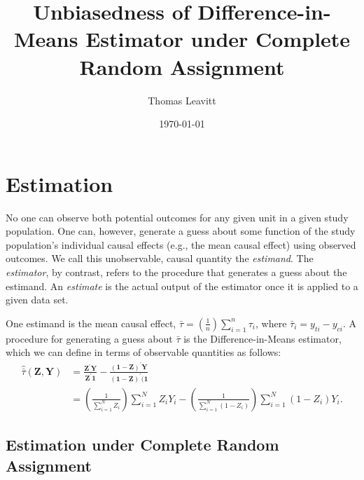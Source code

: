 \documentclass[12pt,leqno]{article}
\theoremstyle{newstyle}
\begin{document}
\begin{titlepage}
\title{Unbiasedness of Difference-in-Means Estimator under Complete Random Assignment}
\author{Thomas Leavitt}
\date{\today}
\maketitle
\end{titlepage}

\section{Estimation}

No one can observe both potential outcomes for any given unit in a given study population. One can, however, generate a guess about some function of the study population's individual causal effects (e.g., the mean causal effect) using observed outcomes. We call this unobservable, causal quantity the \textit{estimand}. The \textit{estimator}, by contrast, refers to the procedure that generates a guess about the estimand. An \textit{estimate} is the actual output of the estimator once it is applied to a given data set.

One estimand is the mean causal effect, $\bar{\tau} = \left(\frac{1}{n}\right)\sum \limits_{i = 1}^n \tau_i$, where $\bar{\tau}_i = y_{ti} - y_{ci}$. A procedure for generating a guess about $\bar{\tau}$ is the Difference-in-Means estimator, which we can define in terms of observable quantities as follows:
\begin{equation}
\begin{split}
\label{eq: diff-in-means est}
\hat{\bar{\tau}}\left(\mathbf{Z}, \mathbf{Y}\right) & = \frac{\mathbf{Z}^{\prime}\mathbf{Y}}{\mathbf{Z}^{\prime}\mathbf{1}} - \frac{(\mathbf{1} - \mathbf{Z})^{\prime} \mathbf{Y}}{(\mathbf{1} - \mathbf{Z})^{\prime}(\mathbf{1}} \\ 
& = \left(\frac{1}{\sum \limits_{i = 1}^N Z_i}\right) \sum \limits_{i = 1}^N Z_i Y_i - \left(\frac{1}{\sum \limits_{i = 1}^N \left(1 - Z_i\right)}\right) \sum \limits_{i = 1}^N \left(1 - Z_i\right) Y_i.
\end{split}
\end{equation}

\subsection{Estimation under Complete Random Assignment}
\end{document}
